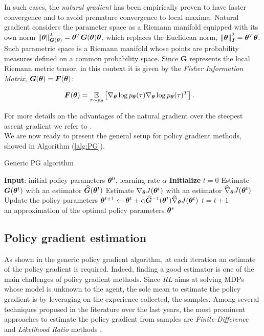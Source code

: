 In such cases, the \emph{natural gradient} has been empirically proven to have faster convergence and to avoid premature convergence to local maxima. Natural gradient considers the parameter space as a Riemann manifold equipped with its own norm $\norm[\boldsymbol{G}(\vtheta)]{\vtheta}^2=\vtheta^T\boldsymbol{G}(\vtheta)\vtheta$, which replaces the Euclidean norm, $\norm[\boldsymbol{I}]{\vtheta}^2=\vtheta^T\vtheta$. Such parametric space is a Riemann manifold whose points are probability measures defined on a common probability space. Since $\boldsymbol{G}$ represents the local Riemann metric tensor, in this context it is given by the \emph{Fisher Information Matrix}, \ie $\boldsymbol{G}(\vtheta)=\boldsymbol{F}(\vtheta)$:

\begin{align}
\boldsymbol{F}(\vtheta) &= \myExpu{\tau\sim p_{\vtheta}}{\nabla_{\vtheta}\log p_{\vtheta}(\tau)\nabla_{\vtheta}\log p_{\vtheta}(\tau)^T}.
\end{align}

For more details on the advantages of the natural gradient over the steepest ascent gradient we refer to \cite{amari1998natural1, amari1998natural2, peters2008reinforcement}. \\
We are now ready to present the general setup for policy gradient methods, showed in Algorithm (\ref{alg:PG}).

\begin{algorithm}[t]
	\caption{Generic \gls{PG} algorithm}
	\label{alg:PG}
	\begin{algorithmic}[1]
	\State \textbf{Input}: initial policy parameters $\vtheta^0$, learning rate $\alpha$
	\State \textbf{Initialize} $t=0$
		\State Estimate $\boldsymbol{G}(\vtheta^t)$ with an estimator $\widehat{\boldsymbol{G}}(\vtheta^t)$
		\State Estimate $\nabla_{\vtheta}J(\vtheta^t)$ with an estimator $\widehat{\nabla}_{\vtheta}J(\vtheta^t)$ \label{step:PGestimation}
		\State Update the policy parameters $\vtheta^{t+1} \leftarrow \vtheta^t+\alpha\widehat{\boldsymbol{G}}^{-1}(\vtheta^t)\widehat{\nabla}_{\vtheta}J(\vtheta^t)$
		\State $t=t+1$
	\EndWhile \\
	\Return an approximation of the optimal policy parameters $\vtheta^*$
	\end{algorithmic}
\end{algorithm}

\subsection{Policy gradient estimation}
As shown in the generic policy gradient algorithm, at each iteration an estimate of the policy gradient is required. Indeed, finding a good estimator is one of the main challenges of policy gradient methods. Since \emph{RL} aims at solving \gls{MDP}s  whose model is unknown to the agent, the sole mean to estimate the policy gradient is by leveraging on the experience collected, \ie the samples. Among several techniques proposed in the literature over the last years, the most prominent approaches to estimate the policy gradient from samples are \emph{Finite-Difference} and \emph{Likelihood Ratio} methods \cite{glynn1990likelihood}.

